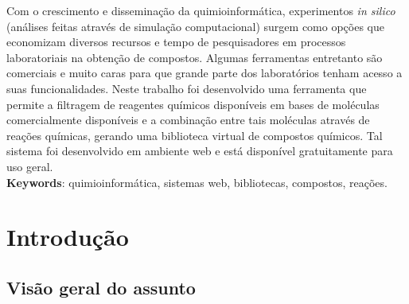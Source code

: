 \documentclass{abnt}
\begin{document}





 

\capa
\folhaderosto

\begin{resumo}
Com o crescimento e disseminação da quimioinformática, experimentos \textit{in silico}
(análises feitas através de simulação computacional) surgem como opções que economizam
diversos recursos e tempo de pesquisadores em processos laboratoriais na obtenção
de compostos. Algumas ferramentas entretanto são comerciais e muito caras para que
grande parte dos laboratórios tenham acesso a suas funcionalidades. Neste trabalho
foi desenvolvido uma ferramenta que permite a filtragem de reagentes químicos disponíveis
em bases de moléculas comercialmente disponíveis e a combinação entre tais moléculas
através de reações químicas, gerando uma biblioteca virtual de compostos químicos.
Tal sistema foi desenvolvido em ambiente web e está disponível gratuitamente para
uso geral.\\

\textbf{Keywords}: quimioinformática, sistemas web, bibliotecas, compostos, reações.
\end{resumo}

\sumario
\listoffigures

\chapter{Introdução}

\section{Visão geral do assunto}
\end{document}
